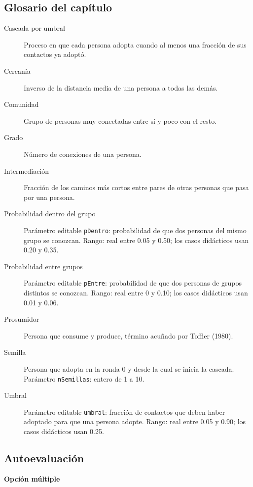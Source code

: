 \subsection*{Glosario del capítulo}
\begin{description}
  \item[Cascada por umbral] Proceso en que cada persona adopta cuando al menos una fracción de sus contactos ya adoptó.
  \item[Cercanía] Inverso de la distancia media de una persona a todas las demás.
  \item[Comunidad] Grupo de personas muy conectadas entre sí y poco con el resto.
  \item[Grado] Número de conexiones de una persona.
  \item[Intermediación] Fracción de los caminos más cortos entre pares de otras personas que pasa por una persona.
  \item[Probabilidad dentro del grupo] Parámetro editable \texttt{pDentro}: probabilidad de que dos personas del mismo grupo se conozcan. Rango: real entre 0.05 y 0.50; los casos didácticos usan 0.20 y 0.35.
  \item[Probabilidad entre grupos] Parámetro editable \texttt{pEntre}: probabilidad de que dos personas de grupos distintos se conozcan. Rango: real entre 0 y 0.10; los casos didácticos usan 0.01 y 0.06.
  \item[Prosumidor] Persona que consume y produce, término acuñado por Toffler (1980).
  \item[Semilla] Persona que adopta en la ronda 0 y desde la cual se inicia la cascada. Parámetro \texttt{nSemillas}: entero de 1 a 10.
  \item[Umbral] Parámetro editable \texttt{umbral}: fracción de contactos que deben haber adoptado para que una persona adopte. Rango: real entre 0.05 y 0.90; los casos didácticos usan 0.25.
\end{description}

\subsection*{Autoevaluación}

\textbf{Opción múltiple}

